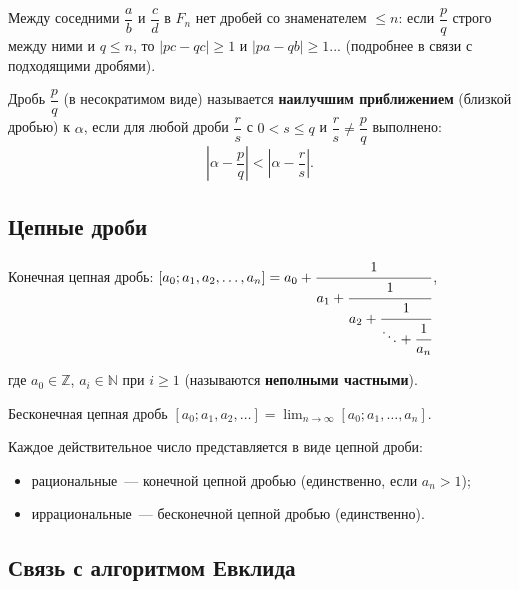 \documentclass[12pt]{article}
\begin{document}
	\begin{corollary}
		Между соседними $\dfrac{a}{b}$ и $\dfrac{c}{d}$ в $F_n$ нет дробей со знаменателем $\leqslant n$: если $\dfrac{p}{q}$ строго между ними и $q \leqslant n$, то $|pc - qc| \geqslant 1$ и $|pa - qb| \geqslant 1$... (подробнее в связи с подходящими дробями).
	\end{corollary}
	
	\begin{definition}
		Дробь $\dfrac{p}{q}$ (в несократимом виде) называется \textbf{наилучшим приближением} (близкой дробью) к $\alpha$, если для любой дроби $\dfrac{r}{s}$ с $0 < s \leqslant q$ и $\dfrac{r}{s} \neq \dfrac{p}{q}$ выполнено:
		\[\left|\alpha - \frac{p}{q}\right| < \left|\alpha - \frac{r}{s}\right|.\]
	\end{definition}
	
	\subsection{Цепные дроби}
	
	\begin{definition}
		Конечная цепная дробь: $[a_0; a_1, a_2, \dots, a_n] = a_0 + \cfrac{1}{a_1 + \cfrac{1}{a_2 + \cfrac{1}{\ddots + \cfrac{1}{a_n}}}}$,
		
		где $a_0 \in \mathbb{Z}$, $a_i \in \mathbb{N}$ при $i \geqslant 1$ (называются \textbf{неполными частными}).
	\end{definition}
	
	\begin{definition}
		Бесконечная цепная дробь $[a_0; a_1, a_2, \dots] = \lim_{n \to \infty} [a_0; a_1, \dots, a_n]$.
	\end{definition}
	
	\begin{theorem}
		Каждое действительное число представляется в виде цепной дроби:
		\begin{itemize}
			\item рациональные~--- конечной цепной дробью (единственно, если $a_n > 1$);
			\item иррациональные~--- бесконечной цепной дробью (единственно).
		\end{itemize}
	\end{theorem}
	
	\subsection{Связь с алгоритмом Евклида}
	
\end{document}
